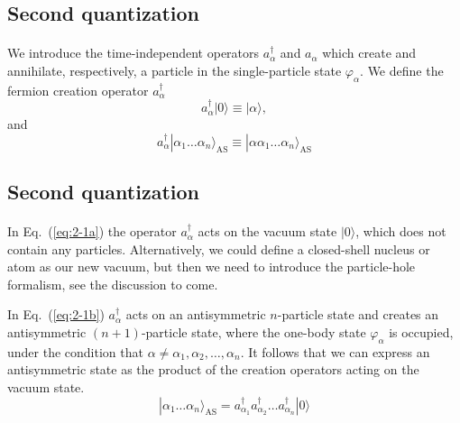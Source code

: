 \documentclass[%
twoside,                 %
final,                   %
10pt]{article}
\begin{document}
\noindent





\subsection*{Second quantization}

\paragraph{}
We introduce the time-independent  operators
$a_\alpha^{\dagger}$ and $a_\alpha$   which create and annihilate, respectively, a particle 
in the single-particle state 
$\varphi_\alpha$. 
We define the fermion creation operator
$a_\alpha^{\dagger}$ 
\begin{equation}
	a_\alpha^{\dagger}|0\rangle \equiv  |\alpha\rangle  \label{eq:2-1a},
\end{equation}
and
\begin{equation}
	a_\alpha^{\dagger}|\alpha_1\dots \alpha_n\rangle_{\mathrm{AS}} \equiv  |\alpha\alpha_1\dots \alpha_n\rangle_{\mathrm{AS}} \label{eq:2-1b}
\end{equation}



\subsection*{Second quantization}

\paragraph{}
In Eq.~(\ref{eq:2-1a}) 
the operator  $a_\alpha^{\dagger}$  acts on the vacuum state 
$|0\rangle$, which does not contain any particles. Alternatively, we could define  a closed-shell nucleus or atom as our new vacuum, but then
we need to introduce the particle-hole  formalism, see the discussion to come. 

In Eq.~(\ref{eq:2-1b}) $a_\alpha^{\dagger}$ acts on an antisymmetric $n$-particle state and 
creates an antisymmetric $(n+1)$-particle state, where the one-body state 
$\varphi_\alpha$ is occupied, under the condition that
$\alpha \ne \alpha_1, \alpha_2, \dots, \alpha_n$. 
It follows that we can express an antisymmetric state as the product of the creation
operators acting on the vacuum state.  
\begin{equation}
	|\alpha_1\dots \alpha_n\rangle_{\mathrm{AS}} = a_{\alpha_1}^{\dagger} a_{\alpha_2}^{\dagger} \dots a_{\alpha_n}^{\dagger} |0\rangle \label{eq:2-2}
\end{equation}
\end{document}
